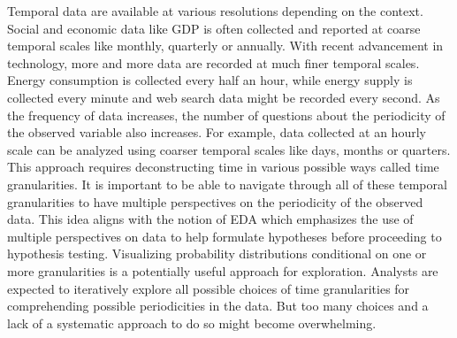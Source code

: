 \documentclass[12pt]{article}
\begin{document}
Temporal data are available at various resolutions depending on the
context. Social and economic data like GDP is often collected and
reported at coarse temporal scales like monthly, quarterly or annually.
With recent advancement in technology, more and more data are recorded
at much finer temporal scales. Energy consumption is collected every
half an hour, while energy supply is collected every minute and web
search data might be recorded every second. As the frequency of data
increases, the number of questions about the periodicity of the observed
variable also increases. For example, data collected at an hourly scale
can be analyzed using coarser temporal scales like days, months or
quarters. This approach requires deconstructing time in various possible
ways called time granularities\citep{aigner2011visualization}. It is
important to be able to navigate through all of these temporal
granularities to have multiple perspectives on the periodicity of the
observed data. This idea aligns with the notion of EDA
\citep{Tukey1977-jx} which emphasizes the use of multiple perspectives
on data to help formulate hypotheses before proceeding to hypothesis
testing. Visualizing probability distributions conditional on one or
more granularities is a potentially useful approach for exploration.
Analysts are expected to iteratively explore all possible choices of
time granularities for comprehending possible periodicities in the data.
But too many choices and a lack of a systematic approach to do so might
become overwhelming.
\end{document}

